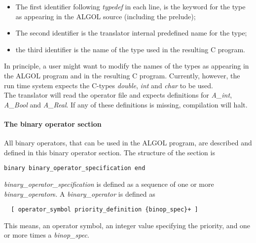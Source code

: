\documentclass[11pt]{article}
\begin{document}
\begin{itemize}
\item The first identifier following {\em typedef} in each line,
is the keyword for the type as appearing in the ALGOL source (including the
prelude);
\item The second identifier is the translator internal predefined
name for the type;
\item the third identifier is the name of the type used in the resulting C program. 
\end{itemize}
In principle, a user might want to modify the names of the
types as appearing in the ALGOL program and in the resulting C program.
Currently, however, the run time system expects the C-types 
{\em double}, {\em int} and {\em char} to be used.
\ \\
The translator will read the operator file and
expects definitions for {\em A\_int},
{\em A\_Bool} and {\em A\_Real}.
If any of these definitions is missing, compilation will halt.

\paragraph{The binary operator section}
All binary operators, 
that can be used in the ALGOL program, are
described and defined in this binary operator section.
The structure of the section is
{\footnotesize
\begin{verbatim}
binary binary_operator_specification end
\end{verbatim}
}
{\em binary\_operator\_specification} is defined as a sequence
of one or more {\em binary\_operator}s.
A {\em binary\_operator} is defined as
{\footnotesize
\begin{verbatim}
  [ operator_symbol priority_definition {binop_spec}+ ]
\end{verbatim}
}
This means, an operator symbol, an integer value specifying the priority,
and one or more times a {\em binop\_spec}.
\end{document}
